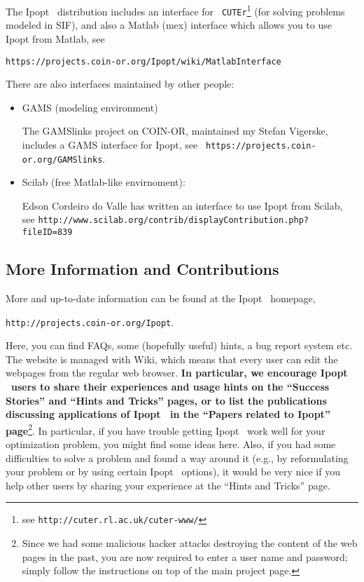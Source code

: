 \documentclass[10pt]{article}
\newcommand{\Ipopt}{{\sc Ipopt }}
\begin{document}
The \Ipopt\ distribution includes an interface for {\tt
  CUTEr}\footnote{see {\tt http://cuter.rl.ac.uk/cuter-www/}} (for
  solving problems modeled in SIF), and also a Matlab (mex) interface
  which allows you to use Ipopt from Matlab, see

\centerline{\tt https://projects.coin-or.org/Ipopt/wiki/MatlabInterface}


There are also interfaces maintained by other people:
\begin{itemize}
\item GAMS (modeling environment)

  The GAMSlinks project on COIN-OR, maintained my Stefan Vigerske,
  includes a GAMS interface for Ipopt, see {\tt
  https://projects.coin-or.org/GAMSlinks}.
\item Scilab (free Matlab-like envirnoment):

  Edson Cordeiro do Valle has written an interface to use Ipopt from
  Scilab,\\ see {\tt http://www.scilab.org/contrib/displayContribution.php?fileID=839}
\end{itemize}

\subsection{More Information and Contributions}
More and up-to-date information can be found at the \Ipopt\ homepage,

\begin{center}
\texttt{http://projects.coin-or.org/Ipopt}.
\end{center}

Here, you can find FAQs, some (hopefully useful) hints, a bug report
system etc.  The website is managed with Wiki, which means that every
user can edit the webpages from the regular web browser.  {\bf In
  particular, we encourage \Ipopt\ users to share their experiences
  and usage hints on the ``Success Stories'' and ``Hints and Tricks''
  pages, or to list the publications discussing applications of
  \Ipopt\ in the ``Papers related to Ipopt'' page}\footnote{Since we
  had some malicious hacker attacks destroying the content of the web
  pages in the past, you are now required to enter a user name and
  password; simply follow the instructions on top of the main project
  page.}.  In particular, if you have trouble getting \Ipopt\ work
well for your optimization problem, you might find some ideas here.
Also, if you had some difficulties to solve a problem and found a way
around it (e.g., by reformulating your problem or by using certain
\Ipopt\ options), it would be very nice if you help other users by
sharing your experience at the ``Hints and Tricks'' page.
\end{document}
